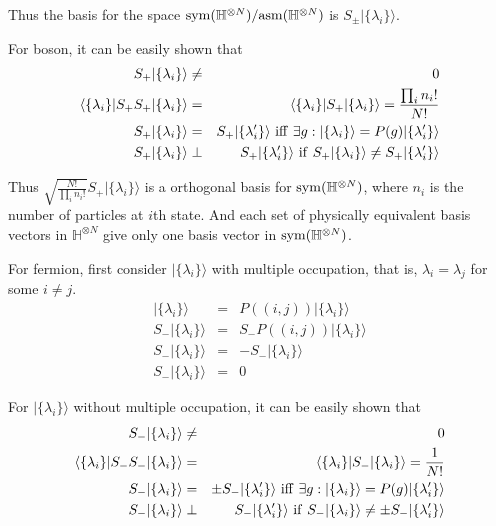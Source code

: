\documentclass[12pt]{book}
\begin{document}
	Thus the basis for the space ${\rm sym}(\mathbb H^{\otimes N})/{\rm asm}(\mathbb H^{\otimes N})$ is $S_\pm|\{\lambda_i\}\rangle$.
	
	For boson, it can be easily shown that
	\begin{eqnarray}
		S_+|\{\lambda_i\}\rangle&\neq&0\\
		\langle\{\lambda_i\}|S_+S_+|\{\lambda_i\}\rangle&=&\langle\{\lambda_i\}|S_+|\{\lambda_i\}\rangle=\frac{\prod_i n_i!}{N!}\\
		S_+|\{\lambda_i\}\rangle&=&S_+|\{\lambda'_i\}\rangle\ {\rm iff}\ \exists g:|\{\lambda_i\}\rangle=P(g)|\{\lambda'_i\}\rangle\\
		S_+|\{\lambda_i\}\rangle&\perp&S_+|\{\lambda'_i\}\rangle\ {\rm if}\ S_+|\{\lambda_i\}\rangle\neq S_+|\{\lambda'_i\}\rangle	
	\end{eqnarray}
	
	Thus $\sqrt{\frac{N!}{\prod_i n_i!}}S_+|\{\lambda_i\}\rangle$ is a orthogonal basis for ${\rm sym}(\mathbb H^{\otimes N})$, where $n_i$ is the number of particles at $i$th state. And each set of physically equivalent basis vectors in $\mathbb H^{\otimes N}$ give only one basis vector in ${\rm sym}(\mathbb H^{\otimes N})$.	
	
	For fermion, first consider $|\{\lambda_i\}\rangle$ with multiple occupation, that is, $\lambda_i=\lambda_j$ for some $i\neq j$.
	\begin{eqnarray}
		|\{\lambda_i\}\rangle&=&P((i,j))|\{\lambda_i\}\rangle\\
		S_-|\{\lambda_i\}\rangle&=&S_-P((i,j))|\{\lambda_i\}\rangle\\
		S_-|\{\lambda_i\}\rangle&=&-S_-|\{\lambda_i\}\rangle\\
		S_-|\{\lambda_i\}\rangle&=&0
	\end{eqnarray}
	
	For $|\{\lambda_i\}\rangle$ without multiple occupation, it can be easily shown that
	\begin{eqnarray}
		S_-|\{\lambda_i\}\rangle&\neq&0\\
		\langle\{\lambda_i\}|S_-S_-|\{\lambda_i\}\rangle&=&\langle\{\lambda_i\}|S_-|\{\lambda_i\}\rangle=\frac 1{N!}\\
		S_-|\{\lambda_i\}\rangle&=&\pm S_-|\{\lambda'_i\}\rangle\ {\rm iff}\ \exists g:|\{\lambda_i\}\rangle=P(g)|\{\lambda'_i\}\rangle\\
		S_-|\{\lambda_i\}\rangle&\perp&S_-|\{\lambda'_i\}\rangle\ {\rm if}\ S_-|\{\lambda_i\}\rangle\neq\pm S_-|\{\lambda'_i\}\rangle	
	\end{eqnarray}
	
\end{document}
